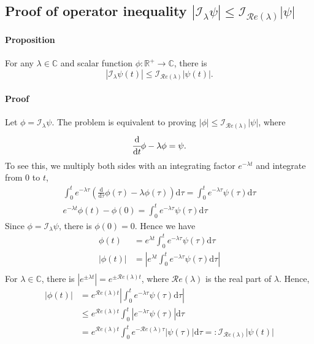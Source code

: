 \documentclass[accepted]{uai2023}
\newcommand{\dt}[1]{\cfrac{\mathrm{d} #1}{\mathrm{d} t}}
\newcommand{\I}{\mathcal{I}}
\renewcommand{\Re}[1]{\mathcal{R}e\left(#1\right)}
\begin{document}
\subsection{Proof of operator inequality $|\I_\lambda \psi| \leq \I_{\Re{\lambda}}|\psi|$}
    \paragraph{Proposition} For any $\lambda \in \mathbb{C}$ and scalar function $\phi: \mathbb{R}^{+} \to \mathbb{C}$, there is 
    \begin{equation}\label{eq:operator-I-inequality}
        |\I_\lambda \psi(t)| \leq \I_{\Re{\lambda}}|\psi(t)|.
    \end{equation}
    \paragraph{Proof} 
    Let $\phi = \I_\lambda \psi$. The problem is equivalent to proving $|\phi| \leq \I_{\Re{\lambda}}|\psi|$, where
    \begin{equation}
        \dt{}\phi-\lambda\phi = \psi.
    \end{equation}
    To see this, we multiply both sides with an integrating factor $e^{-\lambda t}$ and integrate from $0$ to $t$,
    \begin{gather}
        \int_{0}^{t} e^{-\lambda \tau} \left(\frac{\mathrm{d}}{\mathrm{d}\tau}\phi(\tau)-\lambda\phi(\tau)\right)\mathrm{d}\tau = \int_{0}^{t} e^{-\lambda \tau}\psi(\tau) \mathrm{d}\tau\\
        e^{-\lambda t}\phi(t) - \phi(0) = \int_{0}^{t} e^{-\lambda \tau}\psi(\tau) \mathrm{d}\tau
    \end{gather}
    Since $\phi = \I_{\lambda} \psi$, there is $\phi(0) = 0$. Hence we have
    \begin{align}
        \phi(t) &= e^{\lambda t}\int_{0}^{t} e^{-\lambda \tau}\psi(\tau) \mathrm{d}\tau \\
        |\phi(t)| &= \left|e^{\lambda t}\int_{0}^{t} e^{-\lambda \tau}\psi(\tau) \mathrm{d}\tau\right| \\
    \end{align}
    For $\lambda \in \mathbb{C}$, there is $\left|e^{\pm \lambda t}\right| = e^{\pm \Re{\lambda} t}$, where $\Re{\lambda}$ is the real part of $\lambda$.
    Hence,
    \begin{align}
        |\phi(t)| &= e^{\Re{\lambda} t} \left|\int_{0}^{t} e^{-\lambda \tau}\psi(\tau) \mathrm{d}\tau \right| \\
        &\leq e^{\Re{\lambda} t} \int_{0}^{t} \left|e^{-\lambda \tau}\psi(\tau) \right|\mathrm{d}\tau  \\
        &=e^{\Re{\lambda} t} \int_{0}^{t} e^{-\Re{\lambda} \tau}|\psi(\tau)|\mathrm{d}\tau =: \I_{\Re{\lambda}}|\psi(t)|
    \end{align}
\end{document}
